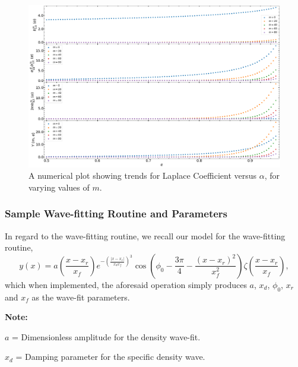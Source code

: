 \documentclass{article}
\begin{document}
\begin{figure}
    \centering
    \includegraphics[width=1\linewidth]{laplace_plot_B.png}
    \caption{A numerical plot showing trends for Laplace Coefficient versus $\alpha$, for varying values of $m$.}
    \label{fig:enter-label}
\end{figure}


\subsubsection{Sample Wave-fitting Routine and Parameters}

In regard to the wave-fitting routine, we recall our model for the wave-fitting routine, 
\begin{equation}
    y(x) = a(\frac{x-x_{r}}{x_{f}})e^{-\left(\frac{|x-x_{r}|}{x_{d}x_{f}}\right)^{3}}\cos\left(\phi_{0} - \frac{3\pi}{4} - \frac{{(x-x_{r})^2}}{{x_{f}^{2}}}\right)\zeta(\frac{x-x_{r}}{x_{f}}), 
\end{equation}
which when implemented, the aforesaid operation simply produces $a$, $x_{d}$, $\phi_{0}$, $x_{r}$ and $x_{f}$ as the wave-fit parameters.

\vspace{3pt}

\textbf{Note:}

\vspace{3pt}
\textbf{$a$} = Dimensionless amplitude for the density wave-fit.

\vspace{3pt}
\textbf{$x_{d}$} = Damping parameter for the specific density wave.
\end{document}
